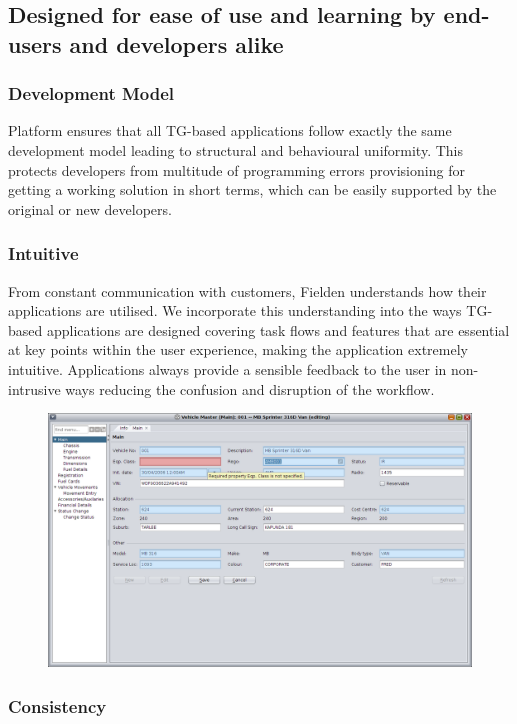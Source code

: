 \documentclass[a4paper,12pt,twocolumn,oneside,openright,final]{memoir}
\begin{document}
\subsection*{Designed for ease of use and learning by end-users and developers alike}

\subsubsection*{Development Model}
  Platform ensures that all TG-based applications follow exactly the same development model leading to structural and behavioural uniformity.
  This protects developers from multitude of programming errors provisioning for getting a working solution in short terms, which can be easily supported by the original or new developers.

\BgThispage
 
\subsubsection*{Intuitive}
  From constant communication with customers, Fielden understands how their applications are utilised. 
  We incorporate this understanding into the ways TG-based applications are designed covering task flows and features that are essential at key points within the user experience, making the application extremely intuitive.
  Applications always provide a sensible feedback to the user in non-intrusive ways reducing the confusion and disruption of the workflow.
  \begin{figure}[!h]
  \centering
  \includegraphics[scale=0.17]{images/04-veh-master-main-error.png}
  \end{figure}

\subsubsection*{Consistency}
\end{document}

